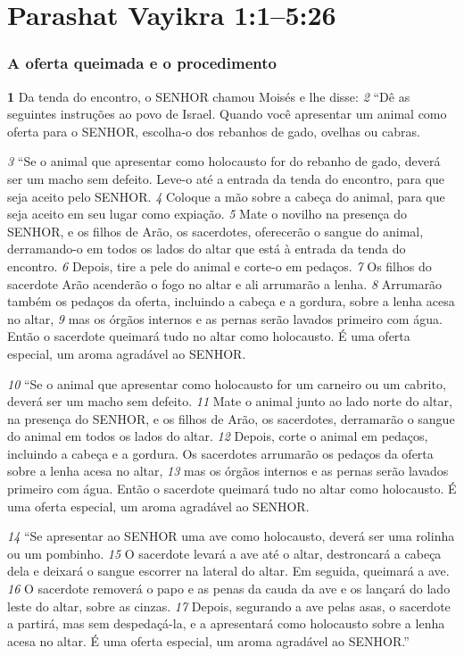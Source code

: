 \section*{Parashat Vayikra 1:1–5:26}    

\bigskip
\subsubsection*{A oferta queimada e o procedimento}
\textbf{\large 1} Da tenda do encontro, o SENHOR chamou Moisés e lhe disse: 
\textit{\tiny 2} 
“Dê as seguintes
instruções ao povo de Israel. Quando você apresentar um animal como oferta
para o SENHOR, escolha-o dos rebanhos de gado, ovelhas ou cabras. 

\smallskip
\textit{\tiny 3} 
“Se o animal que apresentar como holocausto for do rebanho de gado, deverá
ser um macho sem defeito. Leve-o até a entrada da tenda do encontro, para que
seja aceito pelo SENHOR. 
\textit{\tiny 4} 
Coloque a mão sobre a cabeça do animal, para que seja
aceito em seu lugar como expiação. 
\textit{\tiny 5} 
Mate o novilho na presença do SENHOR, e os
filhos de Arão, os sacerdotes, oferecerão o sangue do animal, derramando-o em
todos os lados do altar que está à entrada da tenda do encontro. 
\textit{\tiny 6} 
Depois, tire a
pele do animal e corte-o em pedaços. 
\textit{\tiny 7} 
Os filhos do sacerdote Arão acenderão o
fogo no altar e ali arrumarão a lenha. 
\textit{\tiny 8} 
Arrumarão também os pedaços da oferta,
incluindo a cabeça e a gordura, sobre a lenha acesa no altar, 
\textit{\tiny 9} 
mas os órgãos
internos e as pernas serão lavados primeiro com água. Então o sacerdote
queimará tudo no altar como holocausto. É uma oferta especial, um aroma
agradável ao SENHOR.
   
\smallskip
\textit{\tiny 10}
“Se o animal que apresentar como holocausto for um carneiro ou um cabrito,
deverá ser um macho sem defeito. 
\textit{\tiny 11}
Mate o animal junto ao lado norte do altar,
na presença do SENHOR, e os filhos de Arão, os sacerdotes, derramarão o sangue do
animal em todos os lados do altar. 
\textit{\tiny 12}
Depois, corte o animal em pedaços, incluindo
a cabeça e a gordura. Os sacerdotes arrumarão os pedaços da oferta sobre a lenha
acesa no altar, 
\textit{\tiny 13}
mas os órgãos internos e as pernas serão lavados primeiro com
água. Então o sacerdote queimará tudo no altar como holocausto. É uma oferta
especial, um aroma agradável ao SENHOR.

\smallskip
\textit{\tiny 14}
“Se apresentar ao SENHOR uma ave como holocausto, deverá ser uma rolinha
ou um pombinho. 
\textit{\tiny 15}
O sacerdote levará a ave até o altar, destroncará a cabeça dela
e deixará o sangue escorrer na lateral do altar. Em seguida, queimará a ave. 
\textit{\tiny 16}
O
sacerdote removerá o papo e as penas da cauda da ave e os lançará do lado leste
do altar, sobre as cinzas. 
\textit{\tiny 17}
Depois, segurando a ave pelas asas, o sacerdote a
partirá, mas sem despedaçá-la, e a apresentará como holocausto sobre a lenha
acesa no altar. É uma oferta especial, um aroma agradável ao SENHOR.”
   
